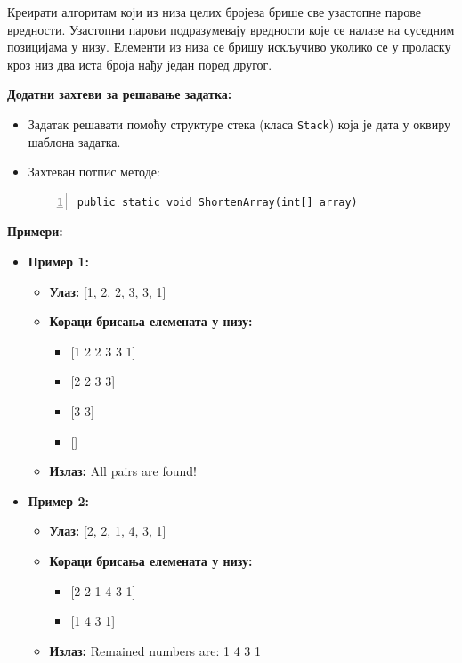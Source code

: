 Креирати алгоритам који из низа целих бројева брише све узастопне парове вредности. Узастопни парови подразумевају вредности које се налазе на суседним позицијама у низу. Елементи из низа се бришу искључиво уколико се у проласку кроз низ два иста броја нађу један поред другог.

\textbf{Додатни захтеви за решавање задатка:}
\begin{itemize}
    \item Задатак решавати помоћу структуре стека (класа \texttt{Stack}) која је дата у оквиру шаблона задатка.
    \item Захтеван потпис методе:
    \begin{Verbatim}[fontsize=\footnotesize, numbers=left, xleftmargin=10mm]
public static void ShortenArray(int[] array)
    \end{Verbatim}
\end{itemize}

\textbf{Примери:}
\begin{itemize}
    \item \textbf{Пример 1:}
    \begin{itemize}
        \item \textbf{Улаз:} [1, 2, 2, 3, 3, 1]
        \item \textbf{Кораци брисања елемената у низу:}
        \begin{itemize}
            \item[] {[1 2 2 3 3 1]}
            \item[] {[2 2 3 3]}
            \item[] {[3 3]}
            \item[] {[]}
        \end{itemize}
        \item \textbf{Излаз:} All pairs are found!
    \end{itemize}
    \item \textbf{Пример 2:}
    \begin{itemize}
        \item \textbf{Улаз:} [2, 2, 1, 4, 3, 1]
        \item \textbf{Кораци брисања елемената у низу:}
        \begin{itemize}
            \item[] {[2 2 1 4 3 1]}
            \item[] {[1 4 3 1]}
        \end{itemize}
        \item \textbf{Излаз:} Remained numbers are: 1 4 3 1
    \end{itemize}
\end{itemize}



